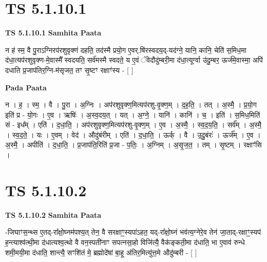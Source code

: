\documentclass[17pt]{extarticle}
\begin{document}

\section{ TS 5.1.10.1 }

\textbf{TS 5.1.10.1 } \newline
\textbf{Samhita Paata} \newline

न ह॑ स्म॒ वै पु॒राऽग्निरप॑रशुवृक्णं दहति॒ तद॑स्मै प्रयो॒ग ए॒वर्.षि॑रस्वदय॒द्-यद॑ग्ने॒ यानि॒ कानि॒ चेति॑ स॒मिध॒मा द॑धा॒त्यप॑रशुवृक्ण-मे॒वास्मै᳚ स्वदयति॒ सर्व॑मस्मै स्वदते॒ य ए॒वं ॅवेदौदु॑म्बरी॒मा द॑धा॒त्यूर्ग्वा उ॑दु॒म्बर॒ ऊर्ज॑मे॒वास्मा॒ अपि॑ दधाति प्र॒जाप॑तिर॒ग्नि-म॑सृजत॒ तꣳ सृ॒ष्टꣳ रक्षाꣳ॑स्य - [  ] \newline

\textbf{Pada Paata} \newline

न । ह॒ । स्म॒ । वै । पु॒रा । अ॒ग्निः । अप॑रशुवृक्ण॒मित्यप॑रशु-वृ॒क्ण॒म् । द॒ह॒ति॒ । तत् । अ॒स्मै॒ । प्र॒यो॒ग इति॑ प्र - यो॒गः । ए॒व । ऋषिः॑ । अ॒स्व॒दय॒त् । यत् । अ॒ग्ने॒ । यानि॑ । कानि॑ । च॒ । इति॑ । स॒मिध॒मिति॑ सं - इध᳚म् । एति॑ । द॒धा॒ति॒ । अप॑रशुवृक्ण॒मित्यप॑रशु-वृ॒क्ण॒म् । ए॒व । अ॒स्मै॒ । स्व॒द॒य॒ति॒ । सर्व᳚म् । अ॒स्मै॒ । स्व॒द॒ते॒ । यः । ए॒वम् । वेद॑ । औदु॑बंरीम् । एति॑ । द॒धा॒ति॒ । ऊर्क् । वै । उ॒दु॒बंरः॑ । ऊर्ज᳚म् । ए॒व । अ॒स्मै॒ । अपीति॑ । द॒धा॒ति॒ । प्र॒जाप॑ति॒रिति॑ प्र॒जा - प॒तिः॒ । अ॒ग्निम् । अ॒सृ॒ज॒त॒ । तम् । सृ॒ष्टम् । रक्षाꣳ॑सि ।  \newline





\section{ TS 5.1.10.2 }

\textbf{TS 5.1.10.2 } \newline
\textbf{Samhita Paata} \newline

-जिघाꣳस॒न्थ्स ए॒तद्-रा᳚क्षो॒घ्नम॑पश्य॒त् तेन॒ वै सरक्षाꣳ॒॒स्यपा॑ऽहत॒ यद्-रा᳚क्षो॒घ्नं भव॑त्य॒ग्नेरे॒व तेन॑ जा॒ताद्-रक्षाꣳ॒॒स्यप॑ ह॒न्त्याश्व॑त्थी॒मा द॑धात्यश्व॒त्थो वै वन॒स्पती॑नाꣳ सपत्नसा॒हो विजि॑त्यै॒ वैक॑ङ्कती॒मा द॑धाति॒ भा ए॒वाव॑ रुन्धे शमी॒मयी॒मा द॑धाति॒ शान्त्यै॒ सꣳशि॑तं मे॒ ब्रह्मोदे॑षां बा॒हू अ॑तिर॒मित्यु॑त्त॒मे औदु॑म्बरी - [  ] \newline
\end{document}
